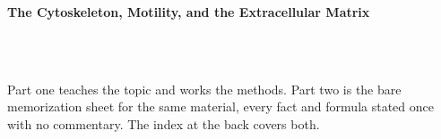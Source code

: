 



\makeindex[title={Index of This Volume},columns=2,intoc]

\begin{titlepage}\thispagestyle{empty}
\vspace*{0.14\textheight}
\noindent{\color{tiercore}\rule{\textwidth}{5pt}}\\[3pt]
\noindent{\color{bioline}\rule{\textwidth}{1pt}}\\[26pt]
\\[12pt]
\noindent\begin{minipage}{\textwidth}\raggedright
{\sffamily\bfseries\fontsize{28}{32}\selectfont\color{bioink}%
 \hyphenchar{} The Cytoskeleton, Motility, and the Extracellular Matrix\par}\end{minipage}\\[16pt]
\noindent{\color{biogreen}\rule{\textwidth}{1.4pt}}\\[10pt]
\noindent\begin{minipage}{\textwidth}\raggedright
{\fontsize{10.5}{14}\selectfont\color{biogreen}%
Part one teaches the topic and works the methods. Part two is the bare memorization sheet for the
same material, every fact and formula stated once with no commentary. The index at the back covers both.\par}\end{minipage}
\vfill
\noindent{\color{bioline}\rule{\textwidth}{1pt}}\\[3pt]
\noindent{\color{tiercore}\rule{\textwidth}{5pt}}
\end{titlepage}
\tableofcontents
\clearpage
{}
\clearpage
\printindex

